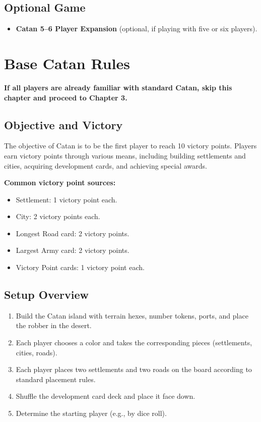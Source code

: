 \documentclass[12pt]{report}
\begin{document}
\section*{Optional Game}
\begin{itemize}[leftmargin=1.2cm]
  \item \textbf{Catan 5--6 Player Expansion} (optional, if playing with five or six players).
\end{itemize}

\chapter{Base Catan Rules}

\textbf{If all players are already familiar with standard Catan, skip this chapter and proceed to Chapter 3.}

\section{Objective and Victory}
The objective of Catan is to be the first player to reach 10 victory points. Players earn victory points through various means, including building settlements and cities, acquiring development cards, and achieving special awards.

\textbf{Common victory point sources:}
\begin{itemize}[leftmargin=1.2cm]
  \item Settlement: 1 victory point each.
  \item City: 2 victory points each.
  \item Longest Road card: 2 victory points.
  \item Largest Army card: 2 victory points.
  \item Victory Point cards: 1 victory point each.
\end{itemize}

\section{Setup Overview}
\begin{enumerate}[leftmargin=1.2cm]
  \item Build the Catan island with terrain hexes, number tokens, ports, and place the robber in the desert.
  \item Each player chooses a color and takes the corresponding pieces (settlements, cities, roads).
  \item Each player places two settlements and two roads on the board according to standard placement rules.
  \item Shuffle the development card deck and place it face down.
  \item Determine the starting player (e.g., by dice roll).
\end{enumerate}
\end{document}
